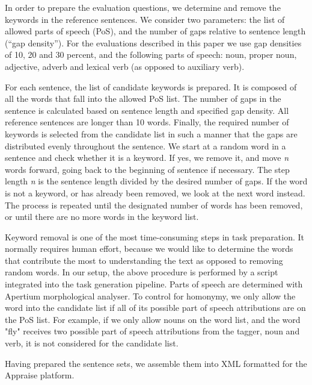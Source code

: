 \documentclass[11pt]{article}
\newcommand{\comment}[1]{\marginpar{\scriptsize\sf \textcolor{blue}{#1}}}
\begin{document}
In order to prepare the evaluation questions, we determine and remove the keywords\comment{MLF: decide, \emph{key words} or \emph{keywords} everywhere} in the 
reference sentences. We consider two parameters: the list of allowed parts of speech (PoS), and the 
number of gaps relative to sentence length (``gap density''). For the evaluations described in 
this paper we use gap densities of 10, 20 and 30 percent, and the following parts of speech: noun, 
proper noun, adjective, adverb and lexical verb (as opposed to auxiliary verb).

For each sentence, the list of candidate keywords is prepared. It is composed of all the words that 
fall into the allowed PoS list. The number of gaps in the sentence is calculated based on 
sentence length and specified gap density. All reference sentences are longer than 10 words. Finally, the required number of keywords is selected 
from the candidate list in such a manner that the gaps are distributed evenly throughout the sentence. We start at a random word in a sentence and check whether it is a keyword. If yes, we remove it, and move \emph{n} words forward, going back to the beginning of sentence if necessary. The step length \emph{n} is the sentence length divided by the desired number of gaps. If the word is not a keyword, or has already been removed, we look at the next word instead. The process is repeated until the designated number of words has been removed, or until there are no more words in the keyword list.\comment{MLF: O'Regan and Forcada did something lots simpler: why not here? It is probably a bit late to change this}

Keyword removal is one of the most time-consuming steps in task preparation. It normally requires human effort, because we would like to determine the words that contribute the most to understanding the text as opposed to removing random words. \comment{MLF: the procedure described so far seems automatic. What's manual and time consuming?} In our setup, the above procedure is performed by a script integrated into the task generation pipeline. Parts of speech are determined with Apertium morphological analyser. To control for homonymy, we only allow the word into the candidate list if all of its possible part of speech attributions are on the PoS list. For example, if we only allow nouns on the word list, and the word "fly" receives two possible part of speech attributions from the tagger, noun and verb, it is not considered for the candidate list.

Having prepared the sentence sets, we assemble them into XML formatted for the Appraise platform.
\end{document}
